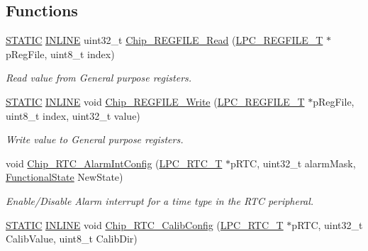 \subsection*{Functions}
\begin{DoxyCompactItemize}
\item 
\hyperlink{group__LPC__Types__Public__Macros_ga10b2d890d871e1489bb02b7e70d9bdfb}{S\+T\+A\+T\+IC} \hyperlink{group__LPC__Types__Public__Types_ga2eb6f9e0395b47b8d5e3eeae4fe0c116}{I\+N\+L\+I\+NE} uint32\+\_\+t \hyperlink{group__RTC__17XX__40XX_gafdad7b4e551aa7e6d52b49a7a072f4ae}{Chip\+\_\+\+R\+E\+G\+F\+I\+L\+E\+\_\+\+Read} (\hyperlink{structLPC__REGFILE__T}{L\+P\+C\+\_\+\+R\+E\+G\+F\+I\+L\+E\+\_\+T} $\ast$p\+Reg\+File, uint8\+\_\+t index)
\begin{DoxyCompactList}\small\item\em Read value from General purpose registers. \end{DoxyCompactList}\item 
\hyperlink{group__LPC__Types__Public__Macros_ga10b2d890d871e1489bb02b7e70d9bdfb}{S\+T\+A\+T\+IC} \hyperlink{group__LPC__Types__Public__Types_ga2eb6f9e0395b47b8d5e3eeae4fe0c116}{I\+N\+L\+I\+NE} void \hyperlink{group__RTC__17XX__40XX_ga8607152173e77715f7cc42be74799b65}{Chip\+\_\+\+R\+E\+G\+F\+I\+L\+E\+\_\+\+Write} (\hyperlink{structLPC__REGFILE__T}{L\+P\+C\+\_\+\+R\+E\+G\+F\+I\+L\+E\+\_\+T} $\ast$p\+Reg\+File, uint8\+\_\+t index, uint32\+\_\+t value)
\begin{DoxyCompactList}\small\item\em Write value to General purpose registers. \end{DoxyCompactList}\item 
void \hyperlink{group__RTC__17XX__40XX_ga2ecd6a555d1a1977a80a30ca21645ca4}{Chip\+\_\+\+R\+T\+C\+\_\+\+Alarm\+Int\+Config} (\hyperlink{structLPC__RTC__T}{L\+P\+C\+\_\+\+R\+T\+C\+\_\+T} $\ast$p\+R\+TC, uint32\+\_\+t alarm\+Mask, \hyperlink{group__LPC__Types__Public__Types_gac9a7e9a35d2513ec15c3b537aaa4fba1}{Functional\+State} New\+State)
\begin{DoxyCompactList}\small\item\em Enable/\+Disable Alarm interrupt for a time type in the R\+TC peripheral. \end{DoxyCompactList}\item 
\hyperlink{group__LPC__Types__Public__Macros_ga10b2d890d871e1489bb02b7e70d9bdfb}{S\+T\+A\+T\+IC} \hyperlink{group__LPC__Types__Public__Types_ga2eb6f9e0395b47b8d5e3eeae4fe0c116}{I\+N\+L\+I\+NE} void \hyperlink{group__RTC__17XX__40XX_ga4f0a93e9a72f793b5891e2d691a1d35d}{Chip\+\_\+\+R\+T\+C\+\_\+\+Calib\+Config} (\hyperlink{structLPC__RTC__T}{L\+P\+C\+\_\+\+R\+T\+C\+\_\+T} $\ast$p\+R\+TC, uint32\+\_\+t Calib\+Value, uint8\+\_\+t Calib\+Dir)

\end{DoxyCompactItemize}
